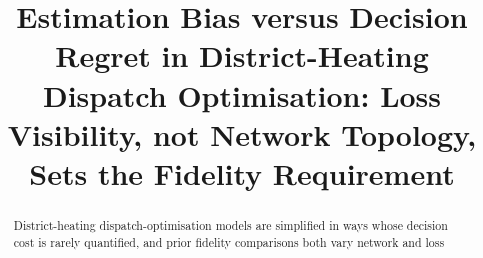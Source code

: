 \documentclass[a4paper,fleqn]{cas-dc}
\begin{document}
\title[mode=title]{%
  Estimation Bias versus Decision Regret in District-Heating Dispatch
  Optimisation: Loss Visibility, not Network Topology, Sets the Fidelity Requirement}

\begin{abstract}
District-heating dispatch-optimisation models are simplified in ways whose decision
cost is rarely quantified, and prior fidelity comparisons both vary network and loss

\end{abstract}
\end{document}
